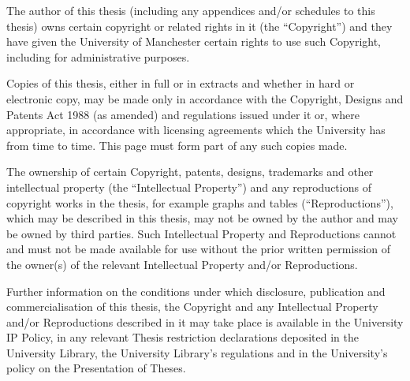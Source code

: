 \begin{Copyright}
    The author of this thesis (including any appendices and/or schedules to this thesis) owns certain
    copyright or related rights in it (the ``Copyright'') and they have given the University of Manchester certain
    rights to use such Copyright, including for administrative purposes.
    
    Copies of this thesis, either in full or in extracts and whether in hard or electronic copy, may be made
    only in accordance with the Copyright, Designs and Patents Act 1988 (as amended) and regulations
    issued under it or, where appropriate, in accordance with licensing agreements which the University
    has from time to time. This page must form part of any such copies made.
    
    The ownership of certain Copyright, patents, designs, trademarks and other intellectual property (the
    ``Intellectual Property'') and any reproductions of copyright works in the thesis, for example graphs and
    tables (``Reproductions''), which may be described in this thesis, may not be owned by the author and
    may be owned by third parties. Such Intellectual Property and Reproductions cannot and must not be
    made available for use without the prior written permission of the owner(s) of the relevant Intellectual
    Property and/or Reproductions.

    Further information on the conditions under which disclosure, publication and commercialisation of this
    thesis, the Copyright and any Intellectual Property and/or Reproductions described in it may take place
    is available in the University IP Policy, in any relevant Thesis restriction declarations deposited in the
    University Library, the University Library's regulations and in the University's policy on the Presentation
    of Theses.
\end{Copyright}
